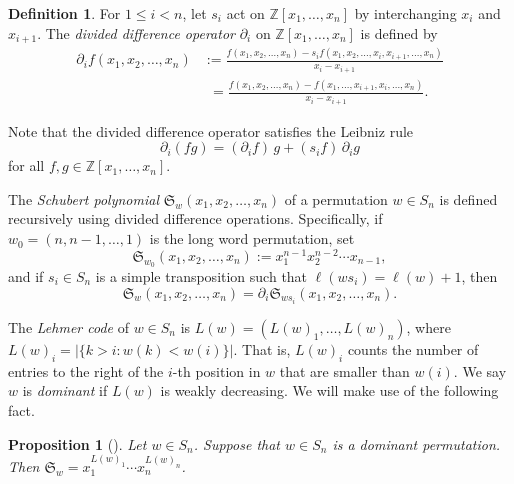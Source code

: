 \documentclass[11pt]{amsart}
\theoremstyle{plain}
\newtheorem{prop}[thm]{Proposition}
\theoremstyle{definition}
\newtheorem{defi}[thm]{Definition}
\newcommand{\Z}{\mathbb{ Z}}           %
\numberwithin{equation}{section}
\begin{document}
\begin{defi}\label{def: divided differences}
For $1\leq i<n$, let $s_i$ act on $\Z[x_1,\ldots,x_n]$ by interchanging $x_i$ and $x_{i+1}$. The \emph{divided difference operator} $\partial_i$ on $\Z[x_1,\ldots,x_n]$ is defined by
\begin{equation}\label{eq: definition divided difference i}
\begin{aligned}
    \partial_i f(x_1, x_2, \dots, x_n)
    &:= \frac{f(x_1, x_2, \dots, x_n) - s_i f(x_1, x_2, \dots, x_i,x_{i+1},\dots, x_n)}{x_i - x_{i+1}} \\
    &\phantom{:}= \frac{f(x_1, x_2, \dots, x_n) - f(x_1, \dots, x_{i+1}, x_i, \dots, x_n)}{x_i - x_{i+1}}.
\end{aligned}
\end{equation}
\end{defi}
Note that the divided difference operator satisfies the Leibniz rule
\begin{equation}\label{dd: Leibniz} 
\partial_i(fg)=(\partial_i f)\,g+(s_i f)\,\partial_i g
\end{equation}
for all $f,g\in\Z[x_1,\ldots,x_n]$.

The \emph{Schubert polynomial} $\mathfrak{S}_w(x_1,x_2,\dots, x_n)$ of a permutation $w\in S_n$ is defined recursively using divided difference operations. Specifically, if $w_0 = (n,n-1,\ldots,1)$ is the long word permutation, set 
\begin{equation}\label{dd: w0}
\mathfrak{S}_{w_0}(x_1,x_2,\dots,x_n):=x_1^{n-1}x_2^{n-2}\cdots x_{n-1}, 
\end{equation}\label{dd: length}
and if $s_i\in S_n$ is a simple transposition such that $\ell(ws_i)=\ell(w)+1$, then 
\begin{equation}\label{eq: div diff prop}
\mathfrak{S}_w(x_1,x_2,\dots, x_n)=\partial_i\mathfrak{S}_{ws_i}(x_1,x_2,\dots, x_n).
\end{equation}

The \emph{Lehmer code} of $w\in S_n$ is $L(w)=(L(w)_1,\ldots,L(w)_n)$, where $L(w)_i=|\{k>i : w(k)<w(i)\}|$.  That is,
$L(w)_i$ counts the number of entries to the right of the $i$-th
position in $w$ that are smaller than $w(i)$. We say  $w$ is \emph{dominant} if $L(w)$ is weakly decreasing. We will make use of  the following fact. 

\begin{prop}[{\cite[Equation (4.7)]{Macdonald1991}}]\label{prop: divided difference facts}
Let $w\in S_n$. 
Suppose that $w\in S_n$ is a dominant permutation. Then $\mathfrak{S}_w=x_1^{L(w)_1}\cdots x_n^{L(w)_n}$.
\end{prop}
\end{document}
